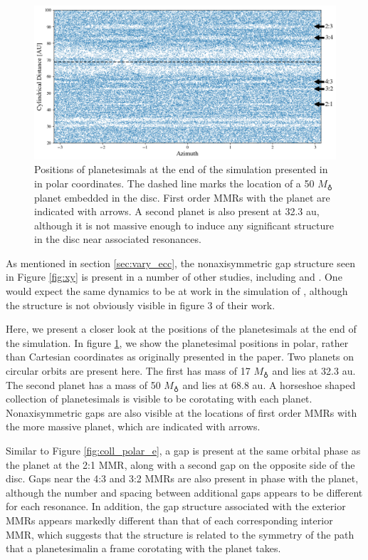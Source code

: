 \begin{figure}
    \includegraphics[width=\textwidth]{figures/grind/boley_rtheta.png}
    \caption{Positions of planetesimals at the end of the simulation presented in \cite{boley17} in polar coordinates. The dashed 
    line marks the location of a 50 $M_{\earth}$ planet embedded in the disc. First order MMRs with the planet are indicated with 
    arrows. A second planet is also present at 32.3 au, although it is not massive enough to induce any significant structure in the 
    disc near associated resonances.\label{fig:boley_rtheta}}
\end{figure}

As mentioned in section \ref{sec:vary_ecc}, the nonaxisymmetric gap structure seen in Figure \ref{fig:xy} is present in a number 
of other studies, including \cite{richardson00} and \cite{tabeshian16}. One would expect the same dynamics to be at work in the 
simulation of \cite{boley17}, although the structure is not obviously visible in figure 3 of their work.

Here, we present a closer look at the positions of the planetesimals at the end of the \cite{boley17} simulation. In figure 
\ref{fig:boley_rtheta}, we show the planetesimal positions in polar, rather than Cartesian coordinates as originally presented in 
the paper. Two planets on circular orbits are present here. The first has mass of 17 $M_{\earth}$ and lies at 32.3 au. The second 
planet has a mass of 50 $M_{\earth}$ and lies at 68.8 au. A horseshoe shaped collection of planetesimals is visible to be 
corotating with each planet. Nonaxisymmetric gaps are also visible at the locations of first order MMRs with the more massive 
planet, which are indicated with arrows.

Similar to Figure \ref{fig:coll_polar_e}, a gap is present at the same orbital phase as the planet at the 2:1 MMR, along with a 
second gap on the opposite side of the disc. Gaps near the 4:3 and 3:2 MMRs are also present in phase with the planet, 
although the number and spacing between additional gaps appears to be different for each resonance. In addition, the gap 
structure associated with the exterior MMRs appears markedly different than that of each corresponding interior MMR, which 
suggests that the structure is related to the symmetry of the path that a planetesimalin a frame corotating with the planet takes.